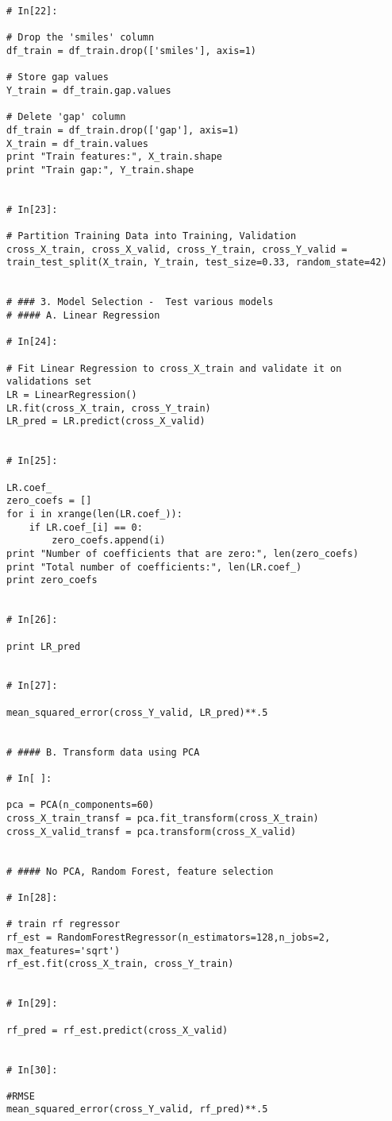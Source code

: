 \documentclass[11pt, oneside]{article}   	%
\begin{document}
\begin{lstlisting}
# In[22]:

# Drop the 'smiles' column 
df_train = df_train.drop(['smiles'], axis=1)

# Store gap values
Y_train = df_train.gap.values

# Delete 'gap' column
df_train = df_train.drop(['gap'], axis=1)
X_train = df_train.values
print "Train features:", X_train.shape
print "Train gap:", Y_train.shape


# In[23]:

# Partition Training Data into Training, Validation
cross_X_train, cross_X_valid, cross_Y_train, cross_Y_valid = train_test_split(X_train, Y_train, test_size=0.33, random_state=42)


# ### 3. Model Selection -  Test various models
# #### A. Linear Regression

# In[24]:

# Fit Linear Regression to cross_X_train and validate it on validations set
LR = LinearRegression()
LR.fit(cross_X_train, cross_Y_train)
LR_pred = LR.predict(cross_X_valid)


# In[25]:

LR.coef_
zero_coefs = []
for i in xrange(len(LR.coef_)):
    if LR.coef_[i] == 0:
        zero_coefs.append(i)
print "Number of coefficients that are zero:", len(zero_coefs)
print "Total number of coefficients:", len(LR.coef_)
print zero_coefs


# In[26]:

print LR_pred


# In[27]:

mean_squared_error(cross_Y_valid, LR_pred)**.5


# #### B. Transform data using PCA

# In[ ]:

pca = PCA(n_components=60)
cross_X_train_transf = pca.fit_transform(cross_X_train)
cross_X_valid_transf = pca.transform(cross_X_valid)


# #### No PCA, Random Forest, feature selection

# In[28]:

# train rf regressor
rf_est = RandomForestRegressor(n_estimators=128,n_jobs=2, max_features='sqrt')
rf_est.fit(cross_X_train, cross_Y_train)


# In[29]:

rf_pred = rf_est.predict(cross_X_valid)


# In[30]:

#RMSE
mean_squared_error(cross_Y_valid, rf_pred)**.5



\end{lstlisting}
\end{document}
